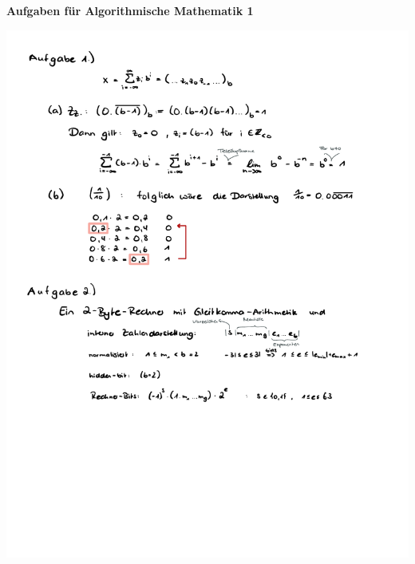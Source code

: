 \documentclass[a4paper,oneside,11pt]{scrartcl}
\begin{document}

\begin{center}
{\Large{\textbf{Aufgaben für Algorithmische Mathematik 1}}} \\
\end{center}

\begin{minipage}[t]{\textwidth}
\includegraphics[scale = 0.75, page=1]{AlMa_blatt02.pdf}
\end{minipage}
\pagebreak
\end{document}
